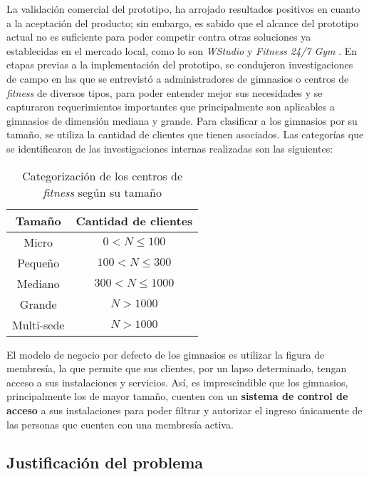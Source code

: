 La validación comercial del prototipo, ha arrojado resultados positivos en cuanto a la aceptación del producto; sin embargo, es sabido que el alcance del prototipo actual no es suficiente para poder competir contra otras soluciones ya establecidas en el mercado local, como lo son \textit{WStudio} \cite{wstudio} y \textit{Fitness 24/7 Gym} \cite{latinsoft}. En etapas previas a la implementación del prototipo, se condujeron investigaciones de campo en las que se entrevistó a administradores de gimnasios o centros de \textit{fitness} de diversos tipos, para poder entender mejor sus necesidades y se capturaron requerimientos importantes que principalmente son aplicables a gimnasios de dimensión mediana y grande. Para clasificar a los gimnasios por su tamaño, se utiliza la cantidad de clientes que tienen asociados. Las categorías que se identificaron de las investigaciones internas realizadas son las siguientes:

 
 \begin{table}[h!]
     \centering
     \begin{tabular}{c|c}
     \hline
          \textbf{Tamaño} & \textbf{Cantidad de clientes}\\
          \hline
          Micro & $0 < N \leq 100$\\
          Pequeño & $100 < N \leq 300$\\
          Mediano & $300 < N \leq 1000$\\
          Grande & $N > 1000$ \\
          Multi-sede &  $N > 1000$\\
          \hline
     \end{tabular}
     \caption{Categorización de los centros de \textit{fitness} según su tamaño}
     \label{tab:sizes}
 \end{table}

 El modelo de negocio por defecto de los gimnasios es utilizar la figura de membresía, la que permite que sus clientes, por un lapso determinado, tengan acceso a sus instalaciones y servicios. Así, es imprescindible que los gimnasios, principalmente los de mayor tamaño, cuenten con un \textbf{sistema de control de acceso} a sus instalaciones para poder filtrar y autorizar el ingreso únicamente de las personas que cuenten con una membresía activa. 
 
 \subsection{Justificación del problema}
 
